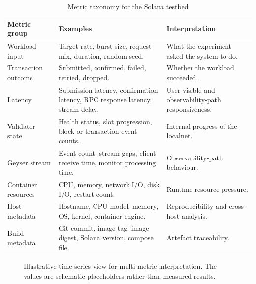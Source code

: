 \documentclass[11pt,a4paper]{article}
\begin{document}
\begin{table}[H]
\centering
\caption{Metric taxonomy for the Solana testbed}
\label{tab:metric-taxonomy}
\begin{tabularx}{\textwidth}{L{3.3cm}Y Y}
\toprule
\textbf{Metric group} & \textbf{Examples} & \textbf{Interpretation} \\
\midrule
Workload input & Target rate, burst size, request mix, duration, random seed. & What the experiment asked the system to do. \\
Transaction outcome & Submitted, confirmed, failed, retried, dropped. & Whether the workload succeeded. \\
Latency & Submission latency, confirmation latency, RPC response latency, stream delay. & User-visible and observability-path responsiveness. \\
Validator state & Health status, slot progression, block or transaction event counts. & Internal progress of the localnet. \\
Geyser stream & Event count, stream gaps, client receive time, monitor processing time. & Observability-path behaviour. \\
Container resources & CPU, memory, network I/O, disk I/O, restart count. & Runtime resource pressure. \\
Host metadata & Hostname, CPU model, memory, OS, kernel, container engine. & Reproducibility and cross-host analysis. \\
Build metadata & Git commit, image tag, image digest, Solana version, compose file. & Artefact traceability. \\
\bottomrule
\end{tabularx}
\end{table}

\begin{figure}[H]
\centering
{}
\caption{Illustrative time-series view for multi-metric interpretation. The values are schematic placeholders rather than measured results.}
\label{fig:illustrative-timeseries}
\end{figure}
\end{document}

